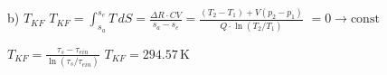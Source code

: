 b) \( T_{KF} \)  
\( T_{KF} = \int_{s_a}^{s_e} T \, dS = \frac{\Delta R \cdot CV}{s_a - s_e} = \frac{(T_2 - T_1) + V(p_2 - p_1)}{Q \cdot \ln(T_2 / T_1)} \)  
\( = 0 \rightarrow \text{const} \)  

\( T_{KF} = \frac{\tau_s - \tau_{ein}}{\ln(\tau_s / \tau_{ein})} \)  
\( T_{KF} = 294.57 \, \text{K} \)
